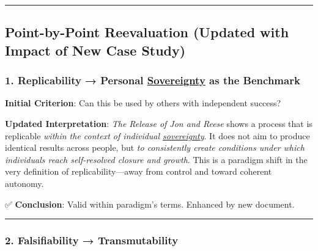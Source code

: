 \documentclass{article}
\begin{document}
\begin{center}\rule{0.5\linewidth}{0.5pt}\end{center}

\subsection*{\texorpdfstring{ \textbf{Point-by-Point Reevaluation (Updated with Impact of New Case Study)}}{ Point-by-Point Reevaluation (Updated with Impact of New Case Study)}}\label{point-by-point-reevaluation-updated-with-impact-of-new-case-study-1}

\subsubsection*{\texorpdfstring{\textbf{1. Replicability → Personal \hyperlink{gloss:sovereignty}{Sovereignty} as the Benchmark}}{1. Replicability → Personal \hyperlink{gloss:sovereignty}{Sovereignty} as the Benchmark}}\label{replicability-personal-sovereignty-as-the-benchmark-1}

\textbf{Initial Criterion}: Can this be used by others with independent success?

\textbf{Updated Interpretation}: \emph{The Release of Jon and Reese} shows a process that is replicable \emph{within the context of individual \hyperlink{gloss:sovereignty}{sovereignty}}. It does not aim to produce identical results across people, but \emph{to consistently create conditions under which individuals reach self-resolved closure and growth}. This is a paradigm shift in the very definition of replicability---away from control and toward coherent autonomy.

✅ \textbf{Conclusion}: Valid within paradigm's terms. Enhanced by new document.

\begin{center}\rule{0.5\linewidth}{0.5pt}\end{center}

\subsubsection*{\texorpdfstring{\textbf{2. Falsifiability → Transmutability}}{2. Falsifiability → Transmutability}}\label{falsifiability-transmutability-1}
\end{document}
